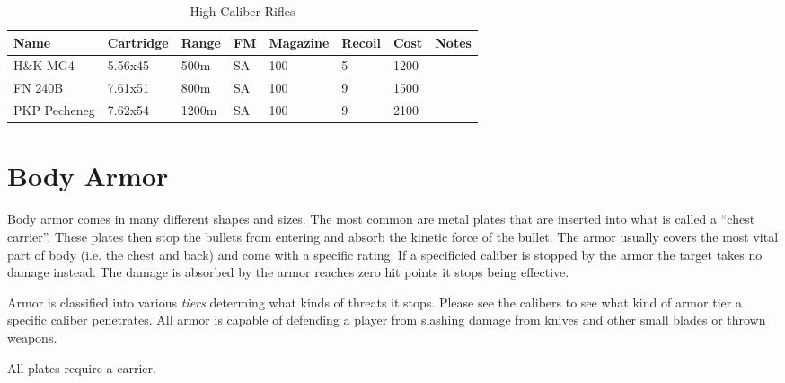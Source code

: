 \begin{table}
  \caption{High-Caliber Rifles}
  \begin{center}
    \begin{tabular}{| l | l | l | l | l | l | l | l |}
      \hline
      \textbf{Name} & \textbf{Cartridge} & \textbf{Range} &
      \textbf{FM} & \textbf{Magazine} & \textbf{Recoil} &
      \textbf{Cost} & \textbf{Notes} \\ \hline


      H\&K MG4     & 5.56x45 &  500m & SA & 100 & 5 & 1200 & \\ \hline
      FN 240B      & 7.61x51 &  800m & SA & 100 & 9 & 1500 & \\ \hline
      PKP Pecheneg & 7.62x54 & 1200m & SA & 100 & 9 & 2100 & \\ \hline

    \end{tabular}
  \end{center}
\end{table}

\section{Body Armor}

Body armor comes in many different shapes and sizes. The most common are metal
plates that are inserted into what is called a ``chest carrier''. These plates
then stop the bullets from entering and absorb the kinetic force of the bullet.
The armor usually covers the most vital part of body (i.e. the chest and back)
and come with a specific rating. If a specificied caliber is stopped by the
armor the target takes no damage instead. The damage is absorbed by the armor
reaches zero hit points it stops being effective.

Armor is classified into various \emph{tiers} determing what kinds of threats
it stops. Please see the calibers to see what kind of armor tier a specific
caliber penetrates. All armor is capable of defending a player from slashing
damage from knives and other small blades or thrown weapons.

All plates require a carrier.

